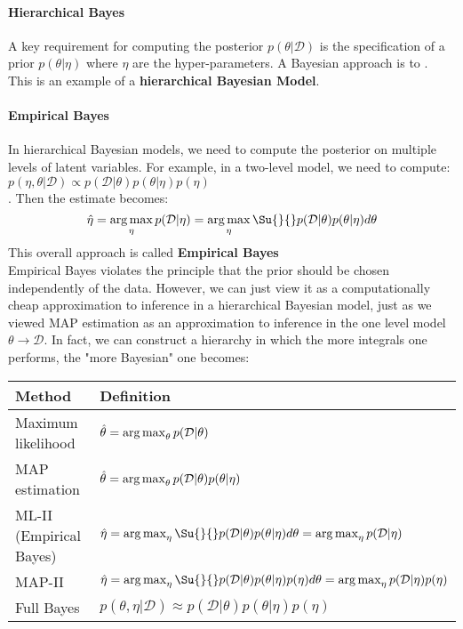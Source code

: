 \paragraph{Hierarchical Bayes}
A key requirement for computing the posterior $p(\theta|\mathcal{D})$ is the 
specification of a prior $p(\theta|\eta)$ where $\eta$ are the hyper-parameters. A 
Bayesian approach is to . This is an example of a \textbf{
hierarchical Bayesian Model}.

\paragraph{Empirical Bayes}
In hierarchical Bayesian models, we need to compute the posterior on multiple levels of
latent variables. For example, in a two-level model, we need to compute:
$p(\eta, \theta|\mathcal{D}) \propto p(\mathcal{D}|\theta)p(\theta|\eta)p(\eta)$\\
. Then the estimate becomes: 
$$ \hat{\eta} = \argmax_{\eta} p(\mathcal{D}|\eta) = \argmax_{\eta} \Su{}{}
p(\mathcal{D}|\theta)p(\theta|\mathcal{\eta})d\theta $$
This overall approach is called \textbf{Empirical Bayes}\\
Empirical Bayes violates the principle that the prior should be chosen independently of 
the data. However, we can just view it as a computationally cheap approximation to 
inference in a hierarchical Bayesian model, just as we viewed MAP estimation as an approximation to inference in the one level model $\theta \rightarrow \mathcal{D}$. In fact, we
can construct a hierarchy in which the more integrals one performs, the "more Bayesian" 
one becomes:
\begin{center}
	\begin{tabular}{|*{2}{l|}}
		\hline
		\textbf{Method} & \textbf{Definition} \\
		\hline
		Maximum likelihood & $\hat{\theta} = \operatorname*{arg\,max}_{\theta} 
		p(\mathcal{D}|\theta)$ \\
		\hline
		MAP estimation & $\hat{\theta} = \operatorname*{arg\,max}_{\theta} 
		p(\mathcal{D}|\theta)p(\theta|\eta)$ \\
		ML-II (Empirical Bayes) & $\hat{\eta}=\argmax_{\eta}\Su{}{}
		p(\mathcal{D}|\theta)p(\theta|\eta)d\theta = \argmax_{\eta}p(\mathcal{D}|
		\eta)$ \\
		\hline
		MAP-II & $\hat{\eta}=\argmax_{\eta}\Su{}{}
		p(\mathcal{D}|\theta)p(\theta|\eta)p(\eta)d\theta = \argmax_{\eta}p(
		\mathcal{D}| \eta)p(\eta)$\\
		\hline
		Full Bayes & $p(\theta, \eta|\mathcal{D}) \approx p(\mathcal{D}|\theta)
		p(\theta|\eta)p(\eta)$\\
		\hline
	\end{tabular}
\end{center}

